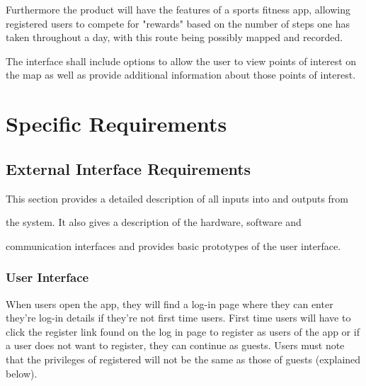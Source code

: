 \documentclass[12pt]{article}
\begin{document}
	

Furthermore the product will have the features of a sports fitness app, allowing registered users to compete for "rewards" based on the number of steps one has taken throughout a day, with this route being possibly mapped and recorded.

The interface shall include options to allow the user to view points of interest on the map as well as provide additional information about those points of interest.







\section{Specific Requirements}

\subsection{External Interface Requirements}

This section provides a detailed description of all inputs into and outputs from

the system. It also gives a description of the hardware, software and

communication interfaces and provides basic prototypes of the user interface.



\subsubsection{User Interface}



{\raggedright

When users open the app, they will find a log-in page where they can enter they're log-in details if they're not first time users. First time users will have to click the register link found on the log in page to register as users of the app or if a user does not want to register, they can continue as guests. Users must note that the privileges of registered will not be the same as those of guests (explained below). 

}
\end{document}
